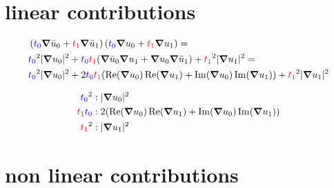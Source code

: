 \documentclass[12pt,a4paper]{article}
\author{Želimir Marojević}
\newcommand{\RE}{\ensuremath{\operatorname{Re}}}
\newcommand{\IM}{\ensuremath{\operatorname{Im}}}
\newcommand{\Vext}{\ensuremath{\operatorname{V_{ext}}}}
\newcommand{\iu}{\ensuremath{\mathbbm{i}}}
\newcommand{\fz}{\ensuremath{{\color{blue}t_0}}}
\newcommand{\fo}{\ensuremath{{\color{red}t_1}}}
\begin{document}





\section{linear contributions}

\begin{align}
&\left( \fz \grad \bar{u}_0 + \fo \grad \bar{u}_1 \right) \left( \fz \grad u_0 + \fo \grad u_1 \right) = \\
&\fz^2 \vert \grad u_0 \vert^2 + \fz \fo ( \grad \bar{u}_0 \grad u_1  + \grad u_0 \grad \bar{u}_1 ) + \fo^2 \vert \grad u_1 \vert^2 = \\
&\fz^2 \vert \grad u_0 \vert^2 + 2 \fz \fo ( \RE(\grad u_0) \RE(\grad u_1) + \IM(\grad u_0) \IM(\grad u_1) ) + \fo^2 \vert \grad u_1 \vert^2 
\end{align}

\begin{align}
\fz^2  &: \vert \grad u_0 \vert^2 \\
\fo\fz &: 2 ( \RE(\grad u_0) \RE(\grad u_1) + \IM(\grad u_0) \IM(\grad u_1) ) \\
\fo^2  &: \vert \grad u_1 \vert^2
\end{align}

\section{non linear contributions}
\end{document}
